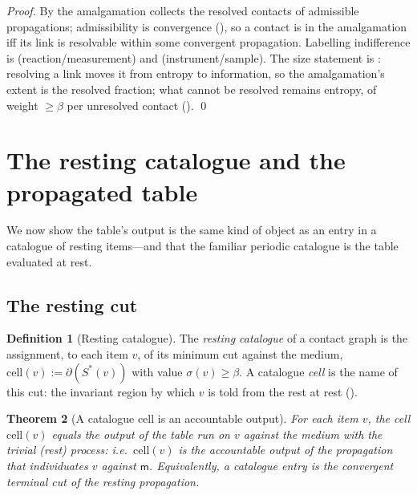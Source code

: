 \documentclass[11pt,a4paper]{article}
\theoremstyle{thmstyle}
\newtheorem{theorem}{Theorem}[section]
\theoremstyle{definition}
\newtheorem{definition}[theorem]{Definition}
\theoremstyle{remark}
\newcommand{\med}{\mathsf{m}}            %
\newcommand{\flo}{\beta}                 %
\newcommand{\cut}{\partial}              %
\newcommand{\str}{\sigma}                %
\begin{document}
\begin{proof}
By  the amalgamation collects the resolved contacts
of admissible propagations; admissibility is convergence
(), so a contact is in the amalgamation iff its
link is resolvable within some convergent propagation. Labelling
indifference is  (reaction/measurement) and
 (instrument/sample). The size statement is
: resolving a link moves it from entropy to
information, so the amalgamation's extent is the resolved fraction; what
cannot be resolved remains entropy, of weight $\ge\flo$ per unresolved
contact (). \qed
\end{proof}

\section{The resting catalogue and the propagated table}
\label{sec:catalogue}

We now show the table's output is the same kind of object as an entry in a
catalogue of resting items---and that the familiar periodic catalogue is
the table evaluated at rest.

\subsection{The resting cut}

\begin{definition}[Resting catalogue]
\label{def:catalogue}
The \emph{resting catalogue} of a contact graph is the assignment, to each
item $v$, of its minimum cut against the medium,
$\mathrm{cell}(v):=\cut(S^{\ast}(v))$ with value $\str(v)\ge\flo$. A
catalogue \emph{cell} is the name of this cut: the invariant region by
which $v$ is told from the rest at rest ().
\end{definition}

\begin{theorem}[A catalogue cell is an accountable output]
\label{thm:cell-is-output}
For each item $v$, the cell $\mathrm{cell}(v)$ equals the output of the
table run on $v$ against the medium with the trivial (rest) process: i.e.\
$\mathrm{cell}(v)$ is the accountable output of the propagation that
individuates $v$ against $\med$. Equivalently, a catalogue entry is the
convergent terminal cut of the resting propagation.
\end{theorem}
\end{document}

